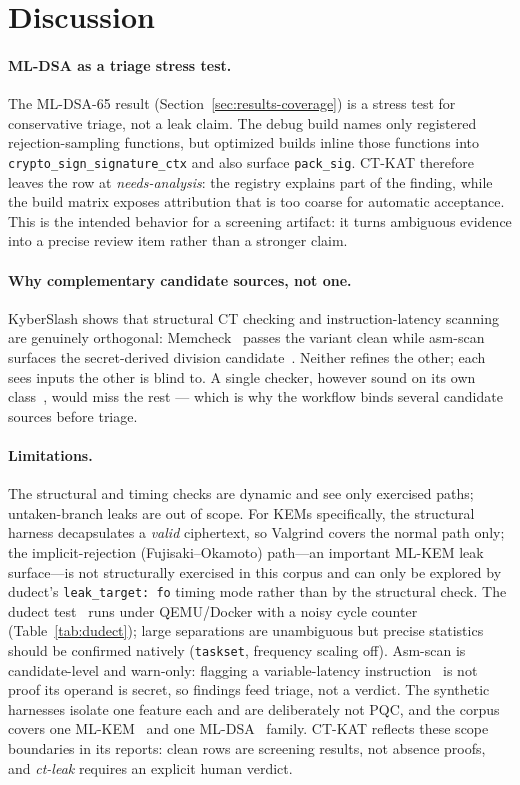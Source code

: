 \section{Discussion}
\label{sec:discussion}

\paragraph{ML-DSA as a triage stress test.}
The ML-DSA-65 result (Section~\ref{sec:results-coverage}) is a stress test for
conservative triage, not a leak claim. The debug build names only registered
rejection-sampling functions, but optimized builds inline those functions into
\texttt{crypto\_sign\_signature\_ctx} and also surface \texttt{pack\_sig}. CT-KAT
therefore leaves the row at \emph{needs-analysis}: the registry explains part of
the finding, while the build matrix exposes attribution that is too coarse for
automatic acceptance. This is the intended behavior for a screening artifact: it
turns ambiguous evidence into a precise review item rather than a stronger claim.

\paragraph{Why complementary candidate sources, not one.}
KyberSlash shows that structural CT checking and instruction-latency scanning
are genuinely orthogonal: Memcheck~\cite{valgrind,ctgrind} passes the variant
clean while asm-scan surfaces the secret-derived division candidate~\cite{kyberslash}.
Neither refines the other; each sees inputs the other is blind to. A single
checker, however sound on its own class~\cite{ctverif,binsecrel}, would miss the
rest --- which is why the workflow binds several candidate sources before triage.

\paragraph{Limitations.}
The structural and timing checks are dynamic and see only exercised paths;
untaken-branch leaks are out of scope. For KEMs specifically, the structural
harness decapsulates a \emph{valid} ciphertext, so Valgrind covers the normal
path only; the implicit-rejection (Fujisaki--Okamoto) path---an important ML-KEM
leak surface---is not structurally exercised in this corpus and can only be explored
by dudect's \texttt{leak\_target:~fo} timing mode rather than by the structural
check. The dudect test~\cite{dudect} runs
under QEMU/Docker with a noisy cycle counter (Table~\ref{tab:dudect}); large
separations are unambiguous but precise statistics should be confirmed
natively (\texttt{taskset}, frequency scaling off). Asm-scan is candidate-level
and warn-only: flagging a variable-latency instruction~\cite{kocher} is not
proof its operand is secret, so findings feed triage, not a verdict. The
synthetic harnesses isolate one feature each and are deliberately not PQC, and
the corpus covers one ML-KEM~\cite{fips203,kyber} and one
ML-DSA~\cite{pqclean} family. CT-KAT reflects these scope boundaries in its
reports: clean rows are screening results, not absence proofs, and \emph{ct-leak}
requires an explicit human verdict.
